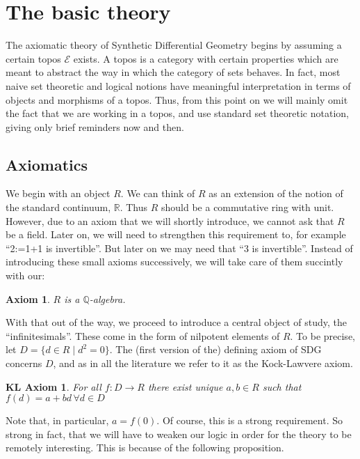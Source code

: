 \documentclass[11pt]{article}
\newtheorem{axiom}{Axiom}
\newtheorem{klaxiom}{KL Axiom}
\theoremstyle{definition}
\numberwithin{equation}{section}
\begin{document}
\section{The basic theory}

The axiomatic theory of Synthetic Differential Geometry begins by assuming a certain topos \( \mathcal{E} \) exists. A topos is a category with certain properties which are meant to abstract the way in which the category of sets behaves. In fact, most naive set theoretic and logical notions have meaningful interpretation in terms of objects and morphisms of a topos. Thus, from this point on we will mainly omit the fact that we are working in a topos, and use standard set theoretic notation, giving only brief reminders now and then. 

\subsection{Axiomatics}

We begin with an object \( R \). We can think of \( R \) as an extension of the notion of the standard continuum, \( \mathbb{R} \). Thus \( R \) should be a commutative ring with unit. However, due to an axiom that we will shortly introduce, we cannot ask that \( R \) be a field. Later on, we will need to strengthen this requirement to, for example ``2:=1+1 is invertible''. But later on we may need that ``3 is invertible''. Instead of introducing these small axioms successively, we will take care of them succintly with our:

\begin{axiom}
  \label{ax0}
  \( R \) is a \( \mathbb{Q} \)-algebra.
\end{axiom}

With that out of the way, we proceed to introduce a central object of study, the ``infinitesimals''. These come in the form of nilpotent elements of \( R \). To be precise, let \( D = \{d\in R \mid d^2=0\} \). The (first version of the) defining axiom of SDG concerns \( D \), and as in all the literature we refer to it as the Kock-Lawvere axiom.

\begin{klaxiom}
  \label{KL1}
  For all \( f:D\to R \) there exist unique \( a,b\in R \) such that \( f(d) = a + bd\,\forall d\in D \)
\end{klaxiom}

Note that, in particular, \( a=f(0) \). Of course, this is a strong requirement. So strong in fact, that we will have to weaken our logic in order for the theory to be remotely interesting. This is because of the following proposition.
\end{document}
